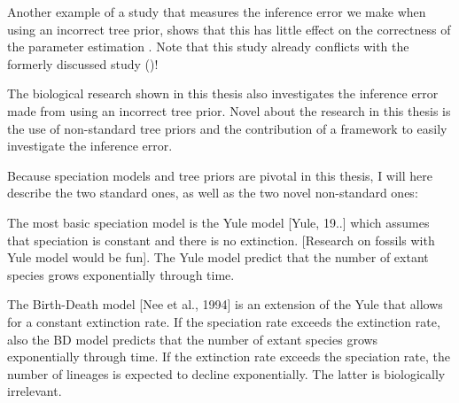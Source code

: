 %
%
%

Another example of a study that measures the inference error
we make when using an incorrect tree prior,
shows that this has little effect on the correctness of the parameter 
estimation \cite{sarver2019choice}. Note that this study already conflicts
with the formerly discussed study (\cite{revell2005under})!

The biological research shown in this thesis also investigates
the inference error made from using an incorrect tree prior.
Novel about the research in this thesis is the use of non-standard tree
priors and the contribution of a framework to easily investigate
the inference error.

Because speciation models and tree priors are pivotal in this thesis, 
I will here describe the two standard ones, as well as the two
novel non-standard ones:

The most basic speciation model
is the Yule model [Yule, 19..] which assumes that speciation
is constant and there is no extinction.
[Research on fossils with Yule model would be fun].
The Yule model predict that the number of extant species
grows exponentially through time.

%

The Birth-Death model [Nee et al., 1994] is an extension of the
Yule that allows for a constant extinction rate. 
If the speciation rate exceeds the extinction rate,
also the BD model predicts that the number of extant species
grows exponentially through time. If the extinction rate exceeds
the speciation rate, the number of lineages is expected to decline
exponentially. The latter is biologically irrelevant.

%

